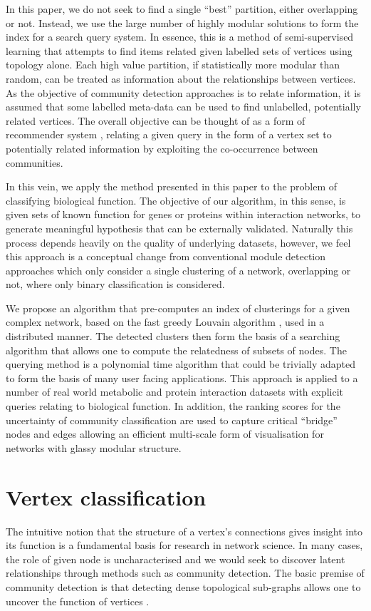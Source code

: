 \documentclass[a4paper,10pt]{article}
\begin{document}
In this paper, we do not seek to find a single ``best'' partition, either overlapping or not.
Instead, we use the large number of highly modular solutions to form the index for a search query system.
In essence, this is a method of semi-supervised learning that attempts to find items related given labelled sets of vertices using topology alone.
Each high value partition, if statistically more modular than random, can be treated as information about the relationships between vertices.
As the objective of community detection approaches is to relate information, it is assumed that some labelled meta-data can be used to find unlabelled, potentially related vertices.
The overall objective can be thought of as a form of recommender system \cite{ricci2011introduction}, relating a given query in the form of a vertex set to potentially related information by exploiting the co-occurrence between communities.

In this vein, we apply the method presented in this paper to the problem of classifying biological function.
The objective of our algorithm, in this sense, is given sets of known function for genes or proteins within interaction networks, to generate meaningful hypothesis that can be externally validated.
Naturally this process depends heavily on the quality of underlying datasets, however, we feel this approach is a conceptual change from conventional module detection approaches which only consider a single clustering of a network, overlapping or not, where only binary classification is considered.

We propose an algorithm that pre-computes an index of clusterings for a given complex network, based on the fast greedy Louvain algorithm \cite{blondel2008fast}, used in a distributed manner.
The detected clusters then form the basis of a searching algorithm that allows one to compute the relatedness of subsets of nodes.
The querying method is a polynomial time algorithm that could be trivially adapted to form the basis of many user facing applications.
This approach is applied to a number of real world metabolic and protein interaction datasets with explicit queries relating to biological function.
In addition, the ranking scores for the uncertainty of community classification are used to capture critical ``bridge'' nodes and edges allowing an efficient multi-scale form of visualisation for networks with glassy modular structure.


\section{Vertex classification}
The intuitive notion that the structure of a vertex's connections gives insight into its function is a fundamental basis for research in network science.
In many cases, the role of given node is uncharacterised and we would seek to discover latent relationships through methods such as community detection.
The basic premise of community detection is that detecting dense topological sub-graphs allows one to uncover the function of vertices \cite{}.
\end{document}
